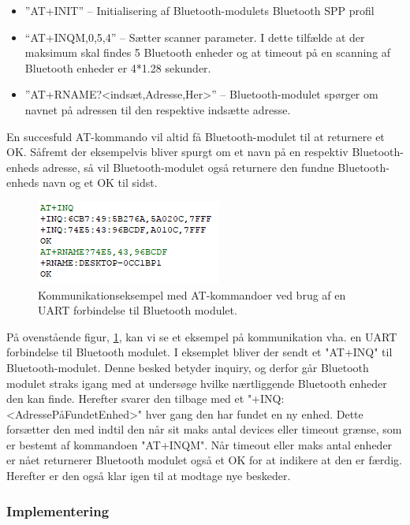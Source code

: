 \begin{itemize}
	\item ”AT+INIT” – Initialisering af Bluetooth-modulets Bluetooth SPP profil
	\item “AT+INQM,0,5,4” – Sætter scanner parameter. I dette tilfælde at der maksimum skal findes 5 Bluetooth enheder og at timeout på en scanning af Bluetooth enheder er 4*1.28 sekunder.
	\item ”AT+RNAME?<indsæt,Adresse,Her>” – Bluetooth-modulet spørger om navnet på adressen til den respektive indsætte adresse.
\end{itemize}

En succesfuld AT-kommando vil altid få Bluetooth-modulet til at returnere et OK. Såfremt der eksempelvis bliver spurgt om et navn på en respektiv Bluetooth-enheds adresse, så vil Bluetooth-modulet også returnere den fundne Bluetooth-enheds navn og et OK til sidst. 

\begin{figure}[H]
	\centering
	\includegraphics[width = 200 pt]{Img/uart_eksempel.PNG}
	\caption{Kommunikationseksempel med AT-kommandoer ved brug af en UART forbindelse til Bluetooth modulet.}
	\label{fig:UART_eksempel}
\end{figure}

På ovenstående figur,  \ref{fig:UART_eksempel}, kan vi se et eksempel på kommunikation vha. en UART forbindelse til Bluetooth modulet. I eksemplet bliver der sendt et "AT+INQ" til Bluetooth-modulet. Denne besked betyder inquiry, og derfor går Bluetooth modulet straks igang med at undersøge hvilke nærtliggende Bluetooth enheder den kan finde. Herefter svarer den tilbage med et "+INQ:<AdressePåFundetEnhed>" hver gang den har fundet en ny enhed. Dette forsætter den med indtil den når sit maks antal devices eller timeout grænse, som er bestemt af kommandoen "AT+INQM". Når timeout eller maks antal enheder er nået returnerer Bluetooth modulet også et OK for at indikere at den er færdig. Herefter er den også klar igen til at modtage nye beskeder.

\subsubsection{Implementering}

